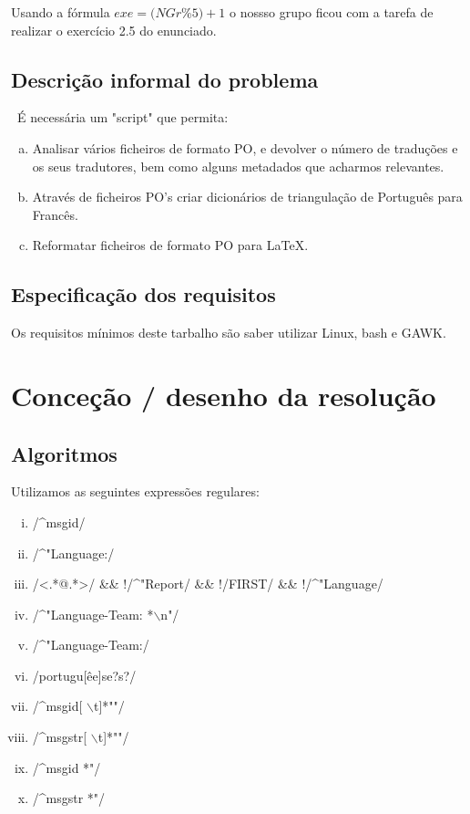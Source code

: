 \documentclass{report}
\begin{document}
Usando a fórmula $ exe = (NGr $\%$ 5) + 1$ o nossso grupo ficou com a tarefa de realizar o exercício 2.5 do enunciado.\\ 

\section{Descrição informal do problema}\
É necessária um "script" que permita:
\begin{enumerate}[a)]
\item Analisar vários ficheiros de formato PO, e devolver o número de traduções
e os seus tradutores, bem como alguns metadados que acharmos relevantes.
\item Através de ficheiros PO's criar dicionários de triangulação de Português
para Francês.
\item Reformatar ficheiros de formato PO para \LaTeX.
\end{enumerate}

\section{Especificação dos requisitos}
Os requisitos mínimos deste tarbalho são saber utilizar Linux, bash e GAWK.

\chapter{Conceção / desenho da resolução}
\section{Algoritmos}
Utilizamos as seguintes expressões regulares:

\begin{enumerate}[i)]
\item /\^{}msgid/
\item /\^{}"Language:/
\item /\textless.*@.*\textgreater/ \&\& !/\^{}"Report/ \&\& !/FIRST/ \&\& !/\^{}"Language/
\item /\^{}"Language-Team: *$\backslash$n"/
\item /\^{}"Language-Team:/
\item /portugu[êe]se?s?/
\item /\^{}msgid[ $\backslash$t]*""/
\item /\^{}msgstr[ $\backslash$t]*""/
\item /\^{}msgid *"/
\item /\^{}msgstr *"/
\end{enumerate}
\end{document}
